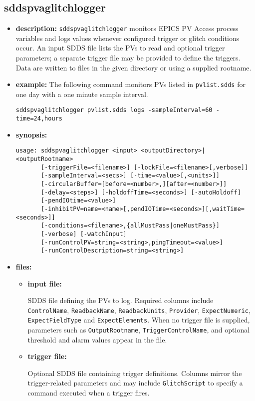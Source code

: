 \begin{latexonly}
\newpage
\end{latexonly}

\subsection{sddspvaglitchlogger}
\label{sddspvaglitchlogger}

\begin{itemize}
\item {\bf description:}
\verb+sddspvaglitchlogger+ monitors EPICS PV Access process variables and
logs values whenever configured trigger or glitch conditions occur.  An input
SDDS file lists the PVs to read and optional trigger parameters; a separate
trigger file may be provided to define the triggers.  Data are written to
files in the given directory or using a supplied rootname.

\item {\bf example:}
The following command monitors PVs listed in \verb+pvlist.sdds+ for one day
with a one minute sample interval.
\begin{verbatim}
sddspvaglitchlogger pvlist.sdds logs -sampleInterval=60 -time=24,hours
\end{verbatim}

\item {\bf synopsis:}
\begin{verbatim}
usage: sddspvaglitchlogger <input> <outputDirectory>|<outputRootname>
       [-triggerFile=<filename>] [-lockFile=<filename>[,verbose]]
       [-sampleInterval=<secs>] [-time=<value>[,<units>]]
       [-circularBuffer=[before=<number>,][after=<number>]]
       [-delay=<steps>] [-holdoffTime=<seconds>] [-autoHoldoff]
       [-pendIOtime=<value>]
       [-inhibitPV=name=<name>[,pendIOTime=<seconds>][,waitTime=<seconds>]]
       [-conditions=<filename>,{allMustPass|oneMustPass}]
       [-verbose] [-watchInput]
       [-runControlPV=string=<string>,pingTimeout=<value>]
       [-runControlDescription=string=<string>]
\end{verbatim}

\item {\bf files:}
  \begin{itemize}
  \item {\bf input file:}\par
    SDDS file defining the PVs to log. Required columns include
    {\tt ControlName}, {\tt ReadbackName}, {\tt ReadbackUnits},
    {\tt Provider}, {\tt ExpectNumeric}, {\tt ExpectFieldType} and
    {\tt ExpectElements}. When no trigger file is supplied, parameters such as
    {\tt OutputRootname}, {\tt TriggerControlName}, and optional threshold and
    alarm values appear in the file.
  \item {\bf trigger file:}\par
    Optional SDDS file containing trigger definitions. Columns mirror the
    trigger-related parameters and may include {\tt GlitchScript} to specify a
    command executed when a trigger fires.
  \end{itemize}


\end{itemize}
